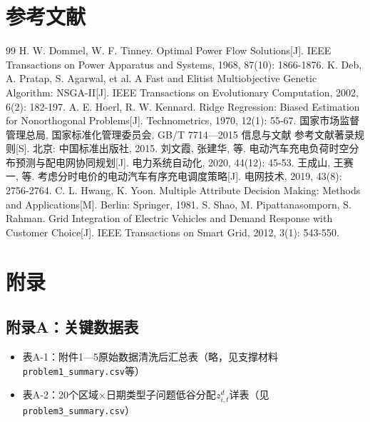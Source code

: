 \documentclass[a4paper,12pt]{ctexart}
\begin{document}
\section{参考文献}
\begin{thebibliography}{99}
 H. W. Dommel, W. F. Tinney. Optimal Power Flow Solutions[J]. IEEE Transactions on Power Apparatus and Systems, 1968, 87(10): 1866-1876.
 K. Deb, A. Pratap, S. Agarwal, et al. A Fast and Elitist Multiobjective Genetic Algorithm: NSGA-II[J]. IEEE Transactions on Evolutionary Computation, 2002, 6(2): 182-197.
 A. E. Hoerl, R. W. Kennard. Ridge Regression: Biased Estimation for Nonorthogonal Problems[J]. Technometrics, 1970, 12(1): 55-67.
 国家市场监督管理总局, 国家标准化管理委员会. GB/T 7714—2015 信息与文献 参考文献著录规则[S]. 北京: 中国标准出版社, 2015.
 刘文霞, 张建华, 等. 电动汽车充电负荷时空分布预测与配电网协同规划[J]. 电力系统自动化, 2020, 44(12): 45-53.
 王成山, 王赛一, 等. 考虑分时电价的电动汽车有序充电调度策略[J]. 电网技术, 2019, 43(8): 2756-2764.
 C. L. Hwang, K. Yoon. Multiple Attribute Decision Making: Methods and Applications[M]. Berlin: Springer, 1981.
 S. Shao, M. Pipattanasomporn, S. Rahman. Grid Integration of Electric Vehicles and Demand Response with Customer Choice[J]. IEEE Transactions on Smart Grid, 2012, 3(1): 543-550.
\end{thebibliography}

\section{附录}
\subsection{附录A：关键数据表}
\begin{itemize}
\item 表A-1：附件1—5原始数据清洗后汇总表（略，见支撑材料\texttt{problem1\_summary.csv}等）
\item 表A-2：20个区域$\times$日期类型子问题低谷分配$z_{i,t}^{d}$详表（见\texttt{problem3\_summary.csv}）
\end{itemize}
\end{document}
